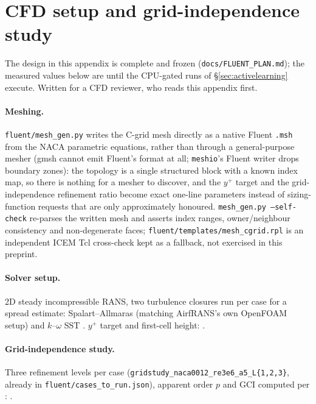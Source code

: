 \documentclass[11pt,a4paper]{article}
\begin{document}
\section{CFD setup and grid-independence study}
\label{app:cfd}
The design in this appendix is complete and frozen (\texttt{docs/FLUENT\_PLAN.md});
the measured values below are  until the CPU-gated runs of
\S\ref{sec:activelearning} execute. Written for a CFD reviewer, who reads this
appendix first.

\paragraph{Meshing.} \texttt{fluent/mesh\_gen.py} writes the C-grid mesh
directly as a native Fluent \texttt{.msh} from the NACA parametric equations,
rather than through a general-purpose mesher (gmsh cannot emit Fluent's format
at all; \texttt{meshio}'s Fluent writer drops boundary zones): the topology is
a single structured block with a known index map, so there is nothing for a
mesher to discover, and the $y^+$ target and the grid-independence refinement
ratio become exact one-line parameters instead of sizing-function requests
that are only approximately honoured. \texttt{mesh\_gen.py --self-check}
re-parses the written mesh and asserts index ranges, owner/neighbour
consistency and non-degenerate faces; \texttt{fluent/templates/mesh\_cgrid.rpl}
is an independent ICEM Tcl cross-check kept as a fallback, not exercised in
this preprint.

\paragraph{Solver setup.} 2D steady incompressible RANS, two turbulence
closures run per case for a spread estimate: Spalart--Allmaras
\citep{spalart1992sa} (matching AirfRANS's own OpenFOAM setup) and
$k$--$\omega$ SST \citep{menter1994sst}. $y^+$ target and first-cell height:
.

\paragraph{Grid-independence study.} Three refinement levels per case
(\texttt{gridstudy\_naca0012\_re3e6\_a5\_L\{1,2,3\}}, already in
\texttt{fluent/cases\_to\_run.json}), apparent order $p$ and GCI computed per
\citet{celik2008gci, roache1994perspective}: .
\end{document}
